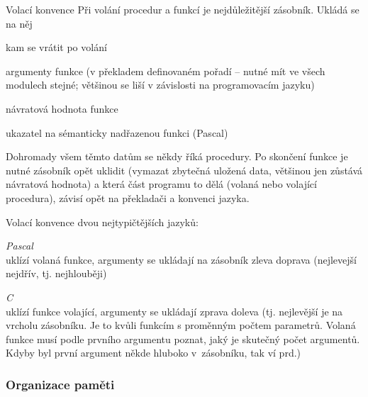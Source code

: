 \begin{obecne}{Volací konvence}
Při volání procedur a funkcí je nejdůležitější zásobník. Ukládá se na něj
\begin{pitemize}
    \item kam se vrátit po volání
    \item argumenty funkce (v překladem definovaném pořadí -- nutné mít ve všech modulech stejné; většinou se liší v závislosti na programovacím jazyku)
    \item návratová hodnota funkce
    \item ukazatel na sémanticky nadřazenou funkci (Pascal) 
\end{pitemize}
Dohromady všem těmto datům se někdy říká  procedury. Po skončení funkce je nutné zásobník opět uklidit (vymazat zbytečná uložená data, většinou jen zůstává návratová hodnota) a která část programu to dělá (volaná nebo volající procedura), závisí opět na překladači a konvenci jazyka.

\medskip\noindent
Volací konvence dvou nejtypičtějších jazyků:
\begin{pitemize}
	\item \emph{Pascal} \\ uklízí volaná funkce, argumenty se ukládají na zásobník zleva doprava (nejlevejší nejdřív, tj. nejhlouběji)
	\item \emph{C} \\ uklízí funkce volající, argumenty se ukládají zprava doleva (tj. nejlevější je na vrcholu zásobníku. Je to kvůli funkcím s proměnným počtem parametrů. Volaná funkce musí podle prvního argumentu poznat, jaký je skutečný počet argumentů. Kdyby byl první argument někde hluboko v~zásobníku, tak ví prd.)
\end{pitemize}
\end{obecne}


\subsubsection*{Organizace paměti}

